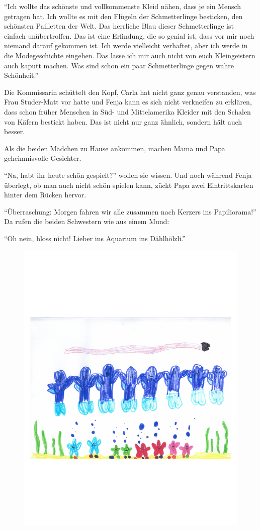 \enquote{Ich wollte das schönste und vollkommenste Kleid nähen, dass je ein Mensch getragen hat. Ich wollte es mit den Flügeln der Schmetterlinge besticken, den schönsten Pailletten der Welt. Das herrliche Blau dieser Schmetterlinge ist einfach unübertroffen. Das ist eine Erfindung, die so genial ist, dass vor mir noch niemand darauf gekommen ist. Ich werde vielleicht verhaftet, aber ich werde in die Modegeschichte eingehen. Das lasse ich mir auch nicht von euch Kleingeistern auch kaputt machen. Was sind schon ein paar Schmetterlinge gegen wahre Schönheit.}

Die Kommissarin schüttelt den Kopf, Carla hat nicht ganz genau verstanden, was Frau Studer-Matt vor hatte und Fenja kann es sich nicht verkneifen zu erklären, dass schon früher Menschen in Süd- und Mittelamerika Kleider mit den Schalen von Käfern bestickt haben. Das ist nicht nur ganz ähnlich, sondern hält auch besser. 

Als die beiden Mädchen zu Hause ankommen, machen Mama und Papa geheimnisvolle Gesichter. 

\enquote{Na, habt ihr heute schön gespielt?} wollen sie wissen. Und noch während Fenja überlegt, ob man auch nicht schön spielen kann, zückt Papa zwei Eintrittskarten hinter dem Rücken hervor.

\enquote{Überraschung: Morgen fahren wir alle zusammen nach Kerzers ins Papiliorama!} Da rufen die beiden Schwestern wie aus einem Mund:

\enquote{Oh nein, bloss nicht! Lieber ins Aquarium ins Dählhölzli.} \hfill {\color{blue}\decofourleft}

\vspace{25pt}
\begin{figure}[h]
\centering
\includegraphics[width=\textwidth]{bilder/kerzers2.pdf}
\end{figure}

